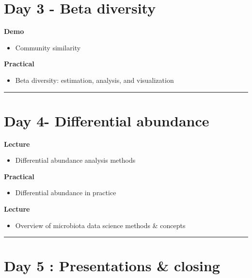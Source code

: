 \documentclass[
  oneside]{book}
\providecommand{\tightlist}{%
  \setlength{\itemsep}{0pt}\setlength{\parskip}{0pt}}
\begin{document}
\hypertarget{day-3---beta-diversity}{%
\section{Day 3 - Beta diversity}\label{day-3---beta-diversity}}

\textbf{Demo}

\begin{itemize}
\tightlist
\item
  Community similarity
\end{itemize}

\textbf{Practical}

\begin{itemize}
\tightlist
\item
  Beta diversity: estimation, analysis, and visualization
\end{itemize}

\begin{center}\rule{0.5\linewidth}{0.5pt}\end{center}

\hypertarget{day-4--differential-abundance}{%
\section{Day 4- Differential abundance}\label{day-4--differential-abundance}}

\textbf{Lecture}

\begin{itemize}
\tightlist
\item
  Differential abundance analysis methods
\end{itemize}

\textbf{Practical}

\begin{itemize}
\tightlist
\item
  Differential abundance in practice
\end{itemize}

\textbf{Lecture}

\begin{itemize}
\tightlist
\item
  Overview of microbiota data science methods \& concepts
\end{itemize}

\begin{center}\rule{0.5\linewidth}{0.5pt}\end{center}

\hypertarget{day-5-presentations-closing}{%
\section{Day 5 : Presentations \& closing}\label{day-5-presentations-closing}}
\end{document}
